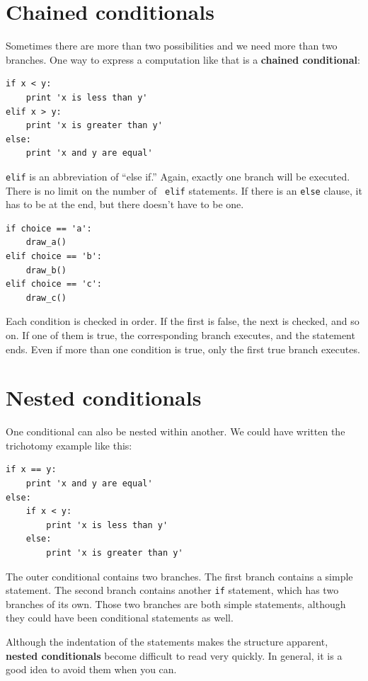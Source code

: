 \documentclass[10pt]{book}
\begin{document}
\begin{CJK}{UTF8}{gbsn}
\section{Chained conditionals}

Sometimes there are more than two possibilities and we need more than
two branches.  One way to express a computation like that is a {\bf
chained conditional}:

\begin{verbatim}
if x < y:
    print 'x is less than y'
elif x > y:
    print 'x is greater than y'
else:
    print 'x and y are equal'
\end{verbatim}
%
{\tt elif} is an abbreviation of ``else if.''  Again, exactly one
branch will be executed.  There is no limit on the number of {\tt
elif} statements.  If there is an {\tt else} clause, it has to be
at the end, but there doesn't have to be one.


\begin{verbatim}
if choice == 'a':
    draw_a()
elif choice == 'b':
    draw_b()
elif choice == 'c':
    draw_c()
\end{verbatim}
%
Each condition is checked in order.  If the first is false,
the next is checked, and so on.  If one of them is
true, the corresponding branch executes, and the statement
ends.  Even if more than one condition is true, only the
first true branch executes.  


\section{Nested conditionals}

One conditional can also be nested within another.  We could have
written the trichotomy example like this:

\begin{verbatim}
if x == y:
    print 'x and y are equal'
else:
    if x < y:
        print 'x is less than y'
    else:
        print 'x is greater than y'
\end{verbatim}
%
The outer conditional contains two branches.  The
first branch contains a simple statement.  The second branch
contains another {\tt if} statement, which has two branches of its
own.  Those two branches are both simple statements,
although they could have been conditional statements as well.

Although the indentation of the statements makes the structure
apparent, {\bf nested conditionals} become difficult to read very
quickly. In general, it is a good idea to avoid them when you can.


\end{CJK}
\end{document}
